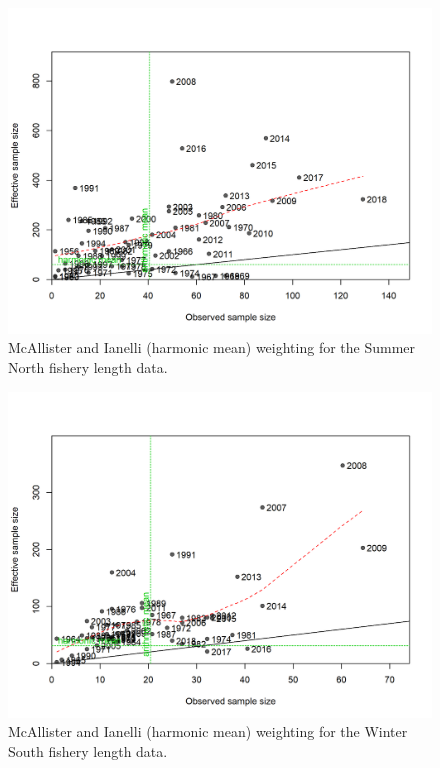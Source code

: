 \documentclass[12pt,]{article}
\begin{document}
\FloatBarrier

\begin{figure}
\centering
\includegraphics{r4ss/plots_mod1/comp_lenfit_sampsize_flt2mkt2.png}
\caption{McAllister and Ianelli (harmonic mean) weighting for the Summer
North fishery length data. \label{fig:harm_mean_sn}}
\end{figure}

\FloatBarrier

\begin{figure}
\centering
\includegraphics{r4ss/plots_mod1/comp_lenfit_sampsize_flt3mkt2.png}
\caption{McAllister and Ianelli (harmonic mean) weighting for the Winter
South fishery length data. \label{fig:harm_mean_ws}}
\end{figure}
\end{document}
